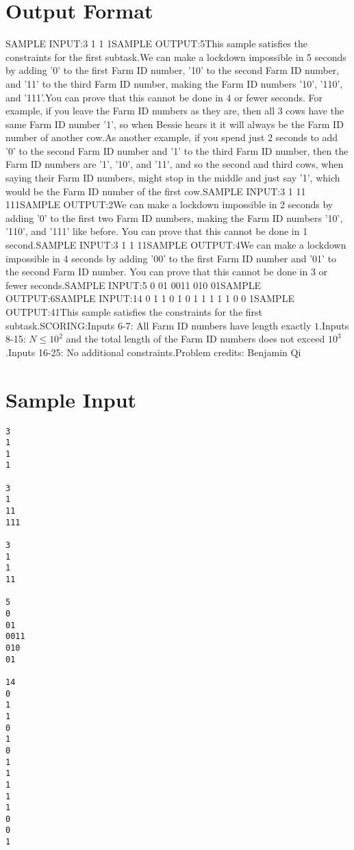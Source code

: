 \documentclass[12pt]{article}
\begin{document}
\section*{Output Format}
SAMPLE INPUT:3
1
1
1SAMPLE OUTPUT:5This sample satisfies the constraints for the first subtask.We can make a lockdown impossible in 5 seconds by adding '0' to the first Farm
ID number, '10' to the second Farm ID number, and '11' to the third Farm ID
number, making the Farm ID numbers '10', '110', and '111'.You can prove that this cannot be done in 4 or fewer seconds. For example, if
you leave the Farm ID numbers as they are, then all 3 cows have the same Farm ID
number '1', so when Bessie hears it it will always be the Farm ID number of
another cow.As another example, if you spend just 2 seconds to add '0' to the second Farm ID
number and '1' to the third Farm ID number, then the Farm ID numbers are '1',
'10', and '11', and so the second and third cows, when saying their Farm ID
numbers, might stop in the middle and just say '1', which would be the Farm ID
number of the first cow.SAMPLE INPUT:3
1
11
111SAMPLE OUTPUT:2We can make a lockdown impossible in 2 seconds by adding '0' to the first two
Farm ID numbers, making the Farm ID numbers '10', '110', and '111' like before.
You can prove that this cannot be done in 1 second.SAMPLE INPUT:3
1
1
11SAMPLE OUTPUT:4We can make a lockdown impossible in 4 seconds by adding '00' to the first Farm
ID number and '01' to the second Farm ID number. You can prove that this cannot
be done in 3 or fewer seconds.SAMPLE INPUT:5
0
01
0011
010
01SAMPLE OUTPUT:6SAMPLE INPUT:14
0
1
1
0
1
0
1
1
1
1
1
0
0
1SAMPLE OUTPUT:41This sample satisfies the constraints for the first subtask.SCORING:Inputs 6-7: All Farm ID numbers have length exactly $1$.Inputs 8-15: $N\le 10^2$ and the total length of the Farm ID numbers does
not exceed $10^3$.Inputs 16-25: No additional constraints.Problem credits: Benjamin Qi

\section*{Sample Input}
\begin{verbatim}
3
1
1
1

3
1
11
111

3
1
1
11

5
0
01
0011
010
01

14
0
1
1
0
1
0
1
1
1
1
1
0
0
1
\end{verbatim}
\end{document}
